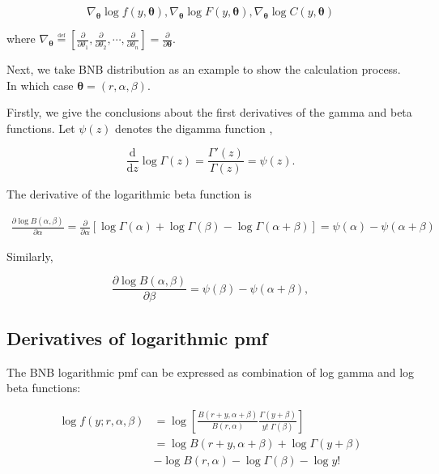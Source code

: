 \documentclass[11pt]{article}
\begin{document}
\begin{equation}
\nabla_{\boldsymbol{\theta}} \log f(y,\boldsymbol\theta), \nabla_{\boldsymbol{\theta}}\log F(y,\boldsymbol\theta), \nabla_{\boldsymbol {\theta}}\log C(y,\boldsymbol\theta)
\end{equation}

where $ \nabla_{\boldsymbol{\theta}}{\overset{\underset {\mathrm{def} }{}}{=}}\left[{\frac{\partial }{\partial \theta_{1}}},{\frac{\partial }{\partial \theta_{2}}},\cdots ,{\frac{\partial }{\partial \theta_{n}}}\right]={\frac{\partial }{\partial {\boldsymbol{\theta}}}}.$



Next, we take BNB distribution as an example to show the calculation process. In which case $\boldsymbol {\theta}=(r,\alpha,\beta)$. 

Firstly, we give the conclusions about the first derivatives of the gamma and beta functions. Let $\psi(z)$ denotes the digamma function \citep[Ch.~5]{olver2010nist},

\begin{equation}
{\frac {\mathrm {d} }{\mathrm {d} z}}\log \Gamma (z) = {\frac {\Gamma '(z)}{\Gamma (z)}} =\psi (z).
\end{equation}

The derivative of the logarithmic beta function is

\begin{equation}
  \begin{aligned}
  \frac{\partial \log B(\alpha,\beta)}{\partial \alpha} = \frac{\partial}{\partial \alpha}\left[ \log\Gamma(\alpha)+\log\Gamma(\beta)-\log\Gamma(\alpha+\beta) \right] = \psi(\alpha) - \psi(\alpha+\beta)
  \end{aligned}
\end{equation}

Similarly,

\begin{equation}
  \frac{\partial \log B(\alpha,\beta)}{\partial \beta} = \psi(\beta) - \psi(\alpha+\beta),
\end{equation}


\subsection*{Derivatives of logarithmic pmf}

 The BNB logarithmic pmf can be expressed as combination of log gamma and log beta functions:

\begin{equation}
\begin{aligned}
	\log f(y;r, \alpha ,\beta) &= \log\left[ \frac {B (r+y,\alpha +\beta )}{B (r,\alpha )} \frac {\Gamma (y+\beta )}{y!\;\Gamma (\beta )} \right] \\
	&= \log B (r+y,\alpha +\beta ) + \log \Gamma (y+\beta ) \\ 
	&- \log B (r,\alpha ) - \log \Gamma (\beta ) - \log y!
\end{aligned}
\end{equation}
\end{document}
